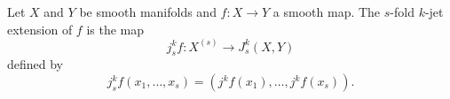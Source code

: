 Let $X$ and $Y$ be smooth manifolds and $f: X \to Y$ a smooth map. The $s$-fold $k$-jet extension of $f$ is the map
$$j_s^k f: X^{(s)} \to J_s^k(X, Y)$$
defined by
$$j_s^k f(x_1, \ldots, x_s) = (j^k f(x_1), \ldots, j^k f(x_s)).$$
